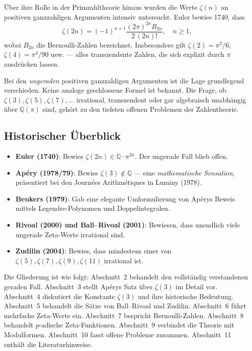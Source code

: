 \documentclass[12pt,a4paper]{amsart}
\theoremstyle{definition}
\theoremstyle{remark}
\begin{document}
Über ihre Rolle in der Primzahltheorie hinaus wurden die Werte $\zeta(n)$ an
positiven ganzzahligen Argumenten intensiv untersucht. Euler bewies 1740, dass
\[
  \zeta(2n) = (-1)^{n+1} \frac{(2\pi)^{2n} B_{2n}}{2\,(2n)!}, \quad n \geq 1,
\]
wobei $B_{2n}$ die Bernoulli-Zahlen bezeichnet. Insbesondere gilt
$\zeta(2) = \pi^2/6$, $\zeta(4) = \pi^4/90$ usw. --- alles transzendente Zahlen,
die sich explizit durch $\pi$ ausdrücken lassen.

Bei den \emph{ungeraden} positiven ganzzahligen Argumenten ist die Lage
grundlegend verschieden. Keine analoge geschlossene Formel ist bekannt. Die Frage,
ob $\zeta(3), \zeta(5), \zeta(7), \ldots$ irrational, transzendent oder gar
algebraisch unabhängig über $\mathbb{Q}(\pi)$ sind, gehört zu den tiefsten offenen
Problemen der Zahlentheorie.

\subsection*{Historischer Überblick}

\begin{itemize}[leftmargin=2em]
  \item \textbf{Euler (1740)}: Bewies $\zeta(2n) \in \mathbb{Q} \cdot \pi^{2n}$.
        Der ungerade Fall blieb offen.
  \item \textbf{Apéry (1978/79)}: Bewies $\zeta(3) \notin \mathbb{Q}$ --- eine
        \emph{mathematische Sensation}, präsentiert bei den Journées Arithmétiques
        in Luminy (1978).
  \item \textbf{Beukers (1979)}: Gab eine elegante Umformulierung von Apérys
        Beweis mittels Legendre-Polynomen und Doppelintegralen.
  \item \textbf{Rivoal (2000) und Ball--Rivoal (2001)}: Bewiesen, dass unendlich
        viele ungerade Zeta-Werte irrational sind.
  \item \textbf{Zudilin (2004)}: Bewies, dass mindestens einer von
        $\zeta(5), \zeta(7), \zeta(9), \zeta(11)$ irrational ist.
\end{itemize}

Die Gliederung ist wie folgt: Abschnitt~2 behandelt den vollständig verstandenen
geraden Fall. Abschnitt~3 stellt Apérys Satz über $\zeta(3)$ im Detail vor.
Abschnitt~4 diskutiert die Konstante $\zeta(3)$ und ihre historische Bedeutung.
Abschnitt~5 behandelt die Sätze von Ball--Rivoal und Zudilin.
Abschnitt~6 führt mehrfache Zeta-Werte ein. Abschnitt~7 bespricht Bernoulli-Zahlen.
Abschnitt~8 behandelt $p$-adische Zeta-Funktionen. Abschnitt~9 verbindet die
Theorie mit Modulformen. Abschnitt~10 fasst offene Probleme zusammen.
Abschnitt~11 enthält die Literaturhinweise.
\end{document}
